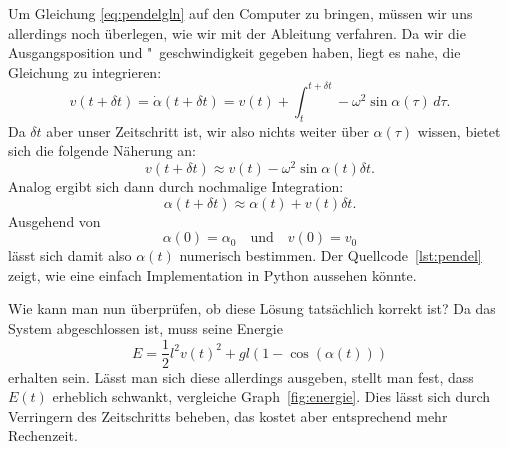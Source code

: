 Um Gleichung \eqref{eq:pendelgln} auf den Computer zu bringen, müssen
wir uns allerdings noch überlegen, wie wir mit der Ableitung verfahren.
Da wir die Ausgangsposition und "~ge\-schwin\-dig\-keit gegeben haben, liegt
es nahe, die Gleichung zu integrieren:
\begin{equation}
  v(t+\delta t) = \dot\alpha(t + \delta t) = v(t) + \int_{t}^{t+\delta t}
  -\omega^2\sin \alpha(\tau)\, d\tau.
\end{equation}
Da $\delta t$ aber unser Zeitschritt ist, wir also nichts weiter über
$\alpha(\tau)$ wissen, bietet sich die folgende Näherung an:
\begin{equation}
  v(t+\delta t) \approx v(t) - \omega^2\sin\alpha(t) \delta t.
\end{equation}
Analog ergibt sich dann durch nochmalige Integration:
\begin{equation}
  \alpha(t+\delta t) \approx \alpha(t) + v(t) \delta t.
  \label{eq:simple}
\end{equation}
Ausgehend von
\begin{equation}
  \alpha(0) = \alpha_0 \quad\text{und}\quad v(0) = v_0
\end{equation}
lässt sich damit also $\alpha(t)$ numerisch bestimmen. Der
Quellcode~\ref{lst:pendel} zeigt, wie eine einfach Implementation in
Python aussehen könnte.

Wie kann man nun überprüfen, ob diese Lösung tatsächlich korrekt ist?
Da das System abgeschlossen ist, muss seine Energie
\begin{equation}
  E = \frac{1}{2} l^2 v(t)^2 + gl (1 - \cos(\alpha(t)))
\end{equation}
erhalten sein. Lässt man sich diese allerdings ausgeben, stellt man
fest, dass $E(t)$ erheblich schwankt, vergleiche
Graph~\ref{fig:energie}. Dies lässt sich durch Verringern des
Zeitschritts beheben, das kostet aber entsprechend mehr Rechenzeit.

